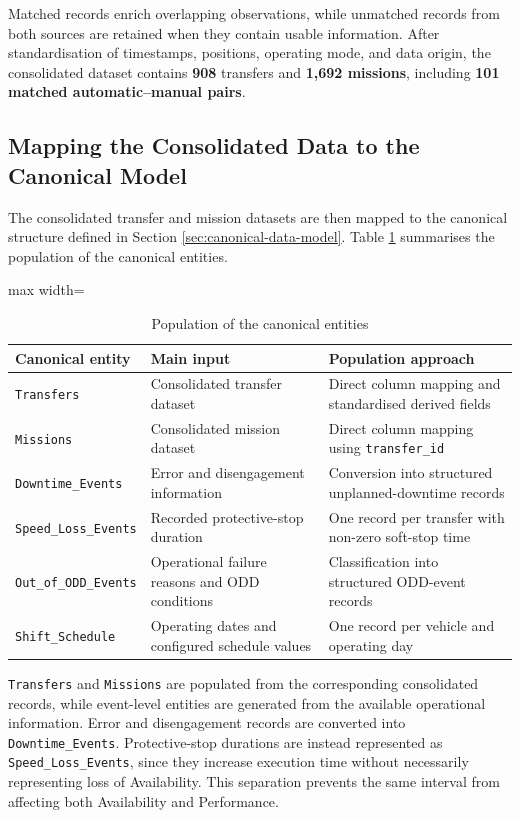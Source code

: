 Matched records enrich overlapping observations, while unmatched records from both sources are retained when they contain usable information. After standardisation of timestamps, positions, operating mode, and data origin, the consolidated dataset contains \textbf{908} transfers and \textbf{1,692 missions}, including \textbf{101 matched automatic–manual pairs}.
\subsection{Mapping the Consolidated Data to the Canonical Model}
\label{subsec:mapping-the-consolidated-data-to-the-canonical-model}
The consolidated transfer and mission datasets are then mapped to the canonical structure defined in Section \ref{sec:canonical-data-model}. Table \ref{tab:canonical-entity-population} summarises the population of the canonical entities.
\begin{table}[H]
\small
\renewcommand{\arraystretch}{1.15}
\centering
\caption{Population of the canonical entities}
\label{tab:canonical-entity-population}
\begin{adjustbox}{max width=\textwidth}
\begin{tabular}{|p{3.7cm}|p{5.2cm}|p{8.0cm}|}
\hline
\textbf{Canonical entity} & \textbf{Main input} & \textbf{Population approach} \\
\hline
\texttt{Transfers} & Consolidated transfer dataset & Direct column mapping and standardised derived fields \\
\hline
\texttt{Missions} & Consolidated mission dataset & Direct column mapping using \texttt{transfer\_id} \\
\hline
\texttt{Downtime\_Events} & Error and disengagement information & Conversion into structured unplanned-downtime records \\
\hline
\texttt{Speed\_Loss\_Events} & Recorded protective-stop duration & One record per transfer with non-zero soft-stop time \\
\hline
\texttt{Out\_of\_ODD\_Events} & Operational failure reasons and ODD conditions & Classification into structured ODD-event records \\
\hline
\texttt{Shift\_Schedule} & Operating dates and configured schedule values & One record per vehicle and operating day \\
\hline
\end{tabular}
\end{adjustbox}
\end{table}

\texttt{Transfers} and \texttt{Missions} are populated from the corresponding consolidated records, while event-level entities are generated from the available operational information. Error and disengagement records are converted into \texttt{Downtime\_Events}. Protective-stop durations are instead represented as \texttt{Speed\_Loss\_Events}, since they increase execution time without necessarily representing loss of Availability. This separation prevents the same interval from affecting both Availability and Performance.

